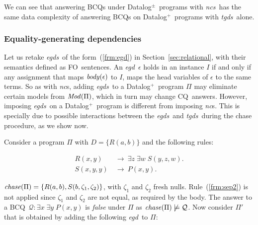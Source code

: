 \documentclass[format=acmsmall, review=false, screen=true]{acmart}
\newcommand{\bcq}{BCQ}
\newcommand{\cq}{CQ}
\newcommand{\boxtheorem}{\ensuremath{\hfill \Box}}
\newcommand{\mc}[1]{\mathcal{ #1}}
\newcommand{\nit}[1]{{\it #1}}
\newcommand{\nc}{{\em nc}}
\newcommand{\dpm}{{Datalog}$^\pm$}
\newcommand{\prg}{\Pi}
\newcommand{\dplus}{{Datalog}$^+$}
\newcommand{\fo}{FO}
\newcommand{\egds}{{\em egds}}
\newcommand{\egd}{{\em egd}}
\newcommand{\tgds}{{\em tgds}}
\newcommand{\ncs}{{\em ncs}}
\begin{document}
{We can see that answering \bcq s under \dpm \ programs with \ncs \ has the same data complexity of answering \bcq s on \dplus \ programs with \tgds \ alone.



\subsubsection{Equality-generating dependencies} \label{sec:egds}

Let us retake \egds \ of the form~(\ref{frm:egd}) in Section~\ref{sec:relational}, with their semantics defined as \fo \ sentences. An \egd \ $\epsilon$ holds in an instance $I$ if and only if any assignment that maps $\nit{body}(\epsilon)$ to $I$, maps the head variables of $\epsilon$ to the same terms. So as with \nc s, adding \egds \ to a \dplus \ program $\prg$ may eliminate certain models from $\nit{Mod}(\prg)$, which in turn may change \cq \ answers. However, imposing \egds \ on a \dplus \ program is different from imposing \nc s. This is specially due to possible interactions between the \egds \ and \tgds \ during the chase procedure, as we show now.

\begin{example} \label{ex:non-separable} Consider a program $\prg$ with $D=\{R(a,b)\}$ and the following rules:

\vspace{-4mm}
\begin{align}
R(x,y) ~&\rightarrow~ \exists z\; \exists w\;S(y,z,w).\label{frm:sep1}\\
S(x,y,y) ~&\rightarrow~ P(x,y).\label{frm:sep2}
\end{align}

\noindent $\nit{chase}(\prg)=\{R(a,b),S(b,\zeta_1,\zeta_2)\}$, with $\zeta_1$ and $\zeta_2$ fresh nulls. Rule~(\ref{frm:sep2}) is not applied since $\zeta_1$ and $\zeta_2$ are not equal, as required by the body. The answer to a \bcq \ $\mc{Q}:\exists x\;\exists y\;P(x,y)$ is {\em false} under $\prg$ as $\nit{chase}(\prg) \not \models \mc{Q}$. Now consider $\prg'$ that is obtained by adding the following \egd \ to $\prg$:


\end{example}}
\end{document}
